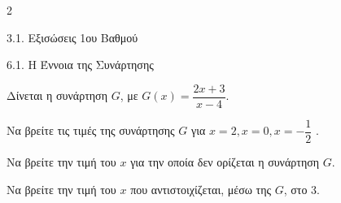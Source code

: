 \begin{ylh}{2}
    \item 3.1. Εξισώσεις 1ου Βαθμού
    \item 6.1. Η Έννοια της Συνάρτησης
\end{ylh}
Δίνεται η συνάρτηση $G$, με $G(x) = \dfrac{2x+3}{x-4}$.
\begin{alist}
\item Να βρείτε τις τιμές της συνάρτησης $G$ για $x = 2, x = 0, x = - \dfrac{1}{2}$ .
\item Να βρείτε την τιμή του $x$ για την οποία δεν ορίζεται η συνάρτηση $G$.
\item Να βρείτε την τιμή του $x$ που αντιστοιχίζεται, μέσω της $G$, στο 3.

\end{alist}

